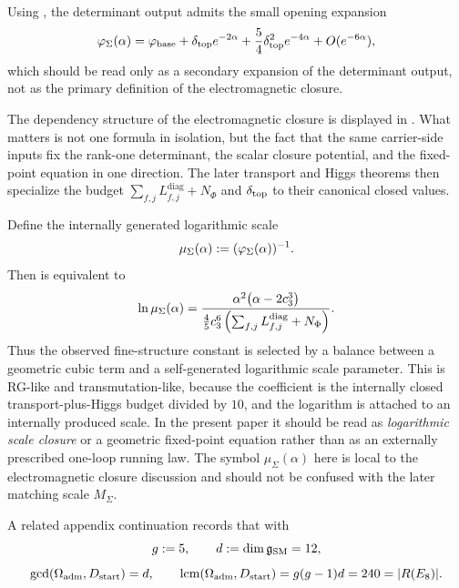\begin{remark}
Using , the determinant output admits the small
opening expansion
\[
\varphi_{\Sigma}(\alpha)
=
\varphi_{\mathrm{base}}
+\delta_{\mathrm{top}} e^{-2\alpha}
+\frac54\delta_{\mathrm{top}}^2e^{-4\alpha}
+O(e^{-6\alpha}),
\]
which should be read only as a secondary expansion of the determinant output, not as the primary
definition of the electromagnetic closure.
\end{remark}

The dependency structure of the electromagnetic closure is displayed in
. What matters is not one formula in isolation, but the fact that
the same carrier-side inputs fix the rank-one determinant, the scalar closure potential, and the
fixed-point equation in one direction. The later transport and Higgs theorems then specialize the
budget $\sum_{f,j}L_{f,j}^{\mathrm{diag}}+N_\Phi$ and $\delta_{\mathrm{top}}$ to their canonical closed values.
\begin{remark}
Define the internally generated logarithmic scale
\[
\mu_\Sigma(\alpha):=(\varphi_{\Sigma}(\alpha))^{-1}.
\]
Then  is equivalent to
\[
\ln \mu_\Sigma(\alpha)
=
\frac{\alpha^2\bigl(\alpha-2c_3^3\bigr)}
{\frac45c_3^6\left(\sum_{f,j}L_{f,j}^{\mathrm{diag}}+N_\Phi\right)}.
\]
Thus the observed fine-structure constant is selected by a balance between a geometric cubic term
and a self-generated logarithmic scale parameter. This is RG-like and transmutation-like,
because the coefficient is the internally closed transport-plus-Higgs budget divided by $10$, and
the logarithm is attached to an internally produced scale. In the present paper it should be read
as \emph{logarithmic scale closure} or a geometric fixed-point equation rather than as an externally
prescribed one-loop running law. The symbol $\mu_\Sigma(\alpha)$ here is local to the
electromagnetic closure discussion and should not be confused with the later matching scale
$M_\Sigma$.
\end{remark}
A related appendix continuation records that with
\[
g:=5,
\qquad
d:=\dim \mathfrak g_{\mathrm{SM}}=12,
\]
\[
\gcd(\Omega_{\mathrm{adm}},D_{\mathrm{start}})=d,
\qquad
\operatorname{lcm}(\Omega_{\mathrm{adm}},D_{\mathrm{start}})=g(g-1)d=240=|R(E_8)|.
\]

